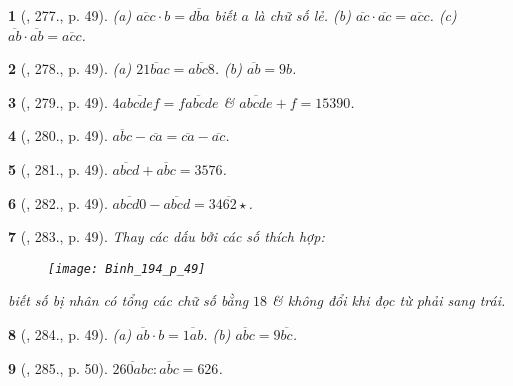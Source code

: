 \documentclass{article}
\newtheorem{baitoan}{}
\begin{document}
\begin{baitoan}[\cite{Binh_Toan_6_tap_1}, 277., p. 49]
	(a) $\overline{acc}\cdot b = \overline{dba}$ biết $a$ là chữ số lẻ. (b) $\overline{ac}\cdot\overline{ac} = \overline{acc}$. (c) $\overline{ab}\cdot\overline{ab} = \overline{acc}$.
\end{baitoan}

\begin{baitoan}[\cite{Binh_Toan_6_tap_1}, 278., p. 49]
	(a) $2\overline{1bac} = \overline{abc8}$. (b) $\overline{ab} = 9b$.
\end{baitoan}

\begin{baitoan}[\cite{Binh_Toan_6_tap_1}, 279., p. 49]
	$4\overline{abcdef} = \overline{fabcde}$ \& $\overline{abcde} + f = 15390$.
\end{baitoan}

\begin{baitoan}[\cite{Binh_Toan_6_tap_1}, 280., p. 49]
	$\overline{abc} - \overline{ca} = \overline{ca} - \overline{ac}$.
\end{baitoan}

\begin{baitoan}[\cite{Binh_Toan_6_tap_1}, 281., p. 49]
	$\overline{abcd} + \overline{abc} = 3576$.
\end{baitoan}

\begin{baitoan}[\cite{Binh_Toan_6_tap_1}, 282., p. 49]
	$\overline{abcd0} - \overline{abcd} = \overline{3462\star}$.
\end{baitoan}

\begin{baitoan}[\cite{Binh_Toan_6_tap_1}, 283., p. 49]
	Thay các dấu {\bf*} bởi các số thích hợp:
	\begin{figure}[H]
		\centering
		\texttt{[image: Binh\_194\_p\_49]}
	\end{figure}
	biết số bị nhân có tổng các chữ số bằng $18$ \& không đổi khi đọc từ phải sang trái.
\end{baitoan}

\begin{baitoan}[\cite{Binh_Toan_6_tap_1}, 284., p. 49]
	(a) $\overline{ab}\cdot b = \overline{1ab}$. (b) $\overline{abc} = 9\overline{bc}$.
\end{baitoan}

\begin{baitoan}[\cite{Binh_Toan_6_tap_1}, 285., p. 50]
	$\overline{260abc}:\overline{abc} = 626$.
\end{baitoan}
\end{document}
